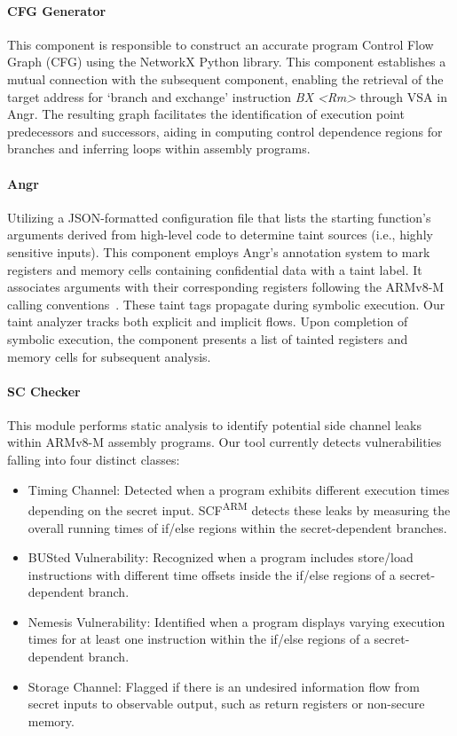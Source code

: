 \paragraph{\textbf{CFG Generator}}
%
This component is responsible to construct an accurate program Control Flow
Graph (CFG) using the NetworkX \cite{networkX} Python library. This
component establishes a mutual connection with the subsequent component,
enabling the retrieval of the target address for ‘branch and exchange’
instruction \textit{BX <Rm>} through \ac{VSA} in Angr. The resulting graph
facilitates the identification of execution point predecessors and
successors, aiding in computing control dependence regions for branches and
inferring loops within assembly programs.

\paragraph{\textbf{Angr}} Utilizing a JSON-formatted configuration file
that lists the starting function's arguments derived from high-level code
to determine taint sources (i.e., highly sensitive inputs). This component
employs Angr's annotation system to mark registers and memory cells
containing confidential data with a taint label. It associates arguments
with their corresponding registers following the ARMv8-M calling
conventions~\cite{armv8m_ref_manual}. These taint tags propagate during
symbolic execution. Our taint analyzer tracks both
explicit and implicit flows. Upon completion of symbolic execution, the
component presents a list of tainted registers and memory cells for
subsequent analysis. 

\paragraph{\textbf{SC Checker}} This module performs static analysis to
identify potential side channel leaks within ARMv8-M assembly programs. Our
\tool{} tool currently detects vulnerabilities
falling into four distinct classes:

\begin{itemize}

\item Timing Channel: Detected when a program exhibits different execution times depending on the secret input. \ac{SCF}\textsuperscript{ARM} detects these leaks by measuring the overall running times of if/else regions within the secret-dependent branches.

\item BUSted Vulnerability: Recognized when a program includes store/load instructions with different time offsets inside the if/else regions of a secret-dependent branch.

\item Nemesis Vulnerability: Identified when a program displays varying execution times for at least one instruction within the if/else regions of a secret-dependent branch.

\item Storage Channel: Flagged if there is an undesired information flow from secret inputs to observable output, such as return registers or non-secure memory.

\end{itemize}
